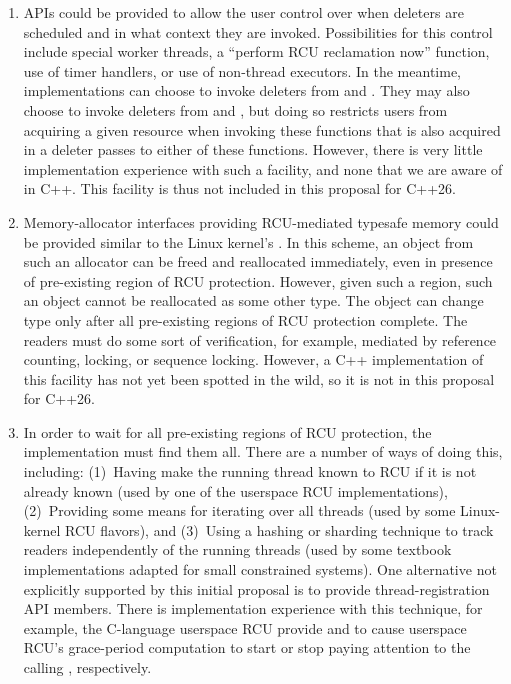 \begin{enumerate}
\item	APIs could be provided to allow the user control over when
	deleters are scheduled and in what context they are invoked.
	Possibilities for this control include special worker threads,
	a ``perform RCU reclamation now'' function, use of timer handlers,
	or use of non-thread executors.
	In the meantime, implementations can choose to invoke deleters
	from  and .
	They may also choose to invoke deleters from 
	and , but doing so restricts users from
	acquiring a given resource when invoking these functions that
	is also acquired in a deleter passes to either of these functions.
	However, there is very little implementation experience with
	such a facility, and none that we are aware of in C++.
	This facility is thus not included in this proposal for C++26.
\item	Memory-allocator interfaces providing RCU-mediated typesafe
	memory could be provided similar to the Linux kernel's
	.
	In this scheme, an object from such an allocator can be freed
	and reallocated immediately, even in presence of pre-existing
	region of RCU protection.
	However, given such a region, such an object cannot be reallocated
	as some other type.
	The object can change type only after all pre-existing regions
	of RCU protection complete.
	The readers must do some sort of verification, for example,
	mediated by reference counting, locking, or sequence locking.
	However, a C++ implementation of this facility has not yet been
	spotted in the wild, so it is not in this proposal for C++26.
\item	In order to wait for all pre-existing regions of RCU protection,
	the implementation must find them all.
	There are a number of ways of doing this, including:
	(1)~Having  make the running thread known
	to RCU if it is not already known (used by one of the userspace
	RCU implementations),
	(2)~Providing some means for iterating over all threads (used
	by some Linux-kernel RCU flavors), and
	(3)~Using a hashing or sharding technique to track readers
	independently of the running threads (used by some textbook
	implementations adapted for small constrained systems).
	One alternative not explicitly supported by this initial
	proposal is to provide thread-registration API members.
	There is implementation experience with this technique,
	for example, the C-language userspace RCU provide
	 and 
	to cause userspace RCU's grace-period computation to start
	or stop paying attention to the calling ,
	respectively.


\end{enumerate}
